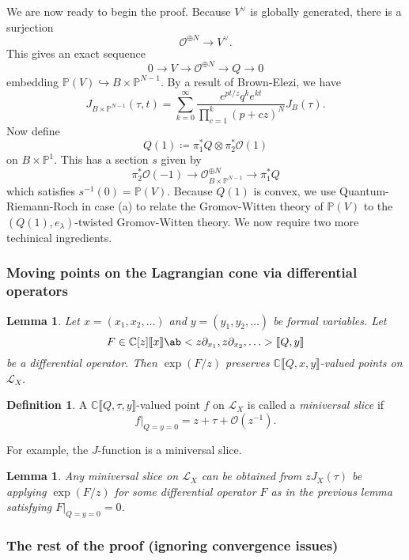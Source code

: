 \documentclass[leqno, openany]{memoir}
\newtheorem{lem}[thm]{Lemma}
\theoremstyle{definition}
\newtheorem{defn}[thm]{Definition}
\theoremstyle{remark}
\theoremstyle{plain}
\theoremstyle{definition}
\theoremstyle{remark}
\newcommand{\C}{\mathbb{C}}
\renewcommand{\P}{\mathbb{P}}
\newcommand{\mc}[1]{\mathcal{#1}}
\begin{document}
We are now ready to begin the proof. Because $V^{\vee}$ is globally generated, there is a surjection
\[ \mc{O}^{\oplus N} \to V^{\vee}. \]
This gives an exact sequence
\[ 0 \to V \to \mc{O}^{\oplus N} \to Q \to 0 \]
embedding $\P(V) \hookrightarrow B \times \P^{N-1}$. By a result of Brown-Elezi, we have
\[ J_{B \times \P^{N-1}}(\tau, t) = \sum_{k=0}^{\infty} \frac{e^{pt/z} q^k e^{kt}}{\prod_{c=1}^k (p+cz)^N} J_B(\tau). \]
Now define
\[ Q(1) \coloneqq \pi_1^* Q \otimes \pi_2^* \mc{O}(1) \]
on $B \times \P^1$. This has a section $s$ given by
\[ \pi_2^* \mc{O}(-1) \to \mc{O}_{B \times \P^{N-1}}^{\oplus N} \to \pi_1^* Q \]
which satisfies $s^{-1}(0) = \P(V)$. Because $Q(1)$ is convex, we use Quantum-Riemann-Roch in case (a) to relate the Gromov-Witten theory of $\P(V)$ to the $(Q(1), e_{\lambda})$-twisted Gromov-Witten theory. We now require two more techinical ingredients.

\subsubsection{Moving points on the Lagrangian cone via differential operators}%
\label{ssub:Moving points on the Lagrangian cone via differential operators}


\begin{lem}\label{lem:1}
    Let $x=(x_1,x_2,\ldots)$ and $y=(y_1,y_2,\ldots)$ be formal variables. Let 
    \[ F \in \C[z] \llbracket x \rrbracket \ab<z \partial_{x_1}, z \partial_{x_2},\ldots> \llbracket Q,y \rrbracket \]
    be a differential operator. Then $\exp(F/z)$ preserves $\C \llbracket Q,x,y \rrbracket$-valued points on $\mc{L}_X$.
\end{lem}

\begin{defn}
    A $\C\llbracket Q,\tau,y \rrbracket$-valued point $f$ on $\mc{L}_X$ is called a \textit{miniversal slice} if
    \[ f |_{Q=y=0} = z + \tau + \mc{O}(z^{-1}). \]
\end{defn}

For example, the $J$-function is a miniversal slice.

\begin{lem}\label{lem:2}
    Any miniversal slice on $\mc{L}_X$ can be obtained from $z J_X(\tau)$ be applying $\exp(F/z)$ for some differential operator $F$ as in the previous lemma satisfying $F|_{Q=y=0} = 0$.
\end{lem}

\subsubsection{The rest of the proof (ignoring convergence issues)}%
\label{ssub:The rest of the proof ignoring convergence issues}
\end{document}
